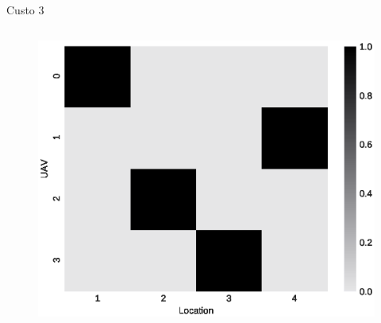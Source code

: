 \begin{frame}{Custo 3}
\begin{columns}
\begin{column}{0.45\textwidth}
\begin{figure}[!htb]
                \end{figure}
                \vspace{-0.5cm}
               \begin{figure}[!htb]
                    \includegraphics[width=\textwidth]{custo_3/590_f_mij_.eps}
                \end{figure}
            \end{column}
        \end{columns}
    \end{frame}